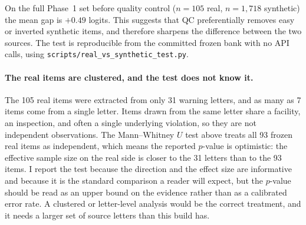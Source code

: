 On the full Phase~1 set before quality control ($n = 105$ real,
$n = 1{,}718$ synthetic) the mean gap is $+0.49$ logits. This suggests
that QC preferentially removes easy or inverted synthetic items, and
therefore sharpens the difference between the two sources. The test is
reproducible from the committed frozen bank with no API calls, using
\texttt{scripts/real\_vs\_synthetic\_test.py}.

\paragraph{The real items are clustered, and the test does not know it.}
The 105 real items were extracted from only 31 warning letters, and as
many as 7 items come from a single letter. Items drawn from the same
letter share a facility, an inspection, and often a single underlying
violation, so they are not independent observations. The Mann--Whitney
$U$ test above treats all 93 frozen real items as independent, which
means the reported $p$-value is optimistic: the effective sample size on
the real side is closer to the 31 letters than to the 93 items. I report
the test because the direction and the effect size are informative and
because it is the standard comparison a reader will expect, but the
$p$-value should be read as an upper bound on the evidence rather than as
a calibrated error rate. A clustered or letter-level analysis would be
the correct treatment, and it needs a larger set of source letters than
this build has.
